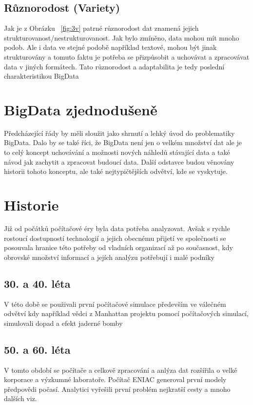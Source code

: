 \subsection{Různorodost (Variety)}
Jak je z Obrázku ~\ref{fig:3v} patrné různorodost dat znamená jejich strukturovanost/nestrukturovanost. Jak bylo zmíněno, data mohou mít mnoho podob. Ale i data ve stejné podobě například textové, mohou být jinak strukturovány a tomuto faktu je potřeba se přizpůsobit a uchovávat a zpracovávat data v jiných formátech. Tato různorodost a adaptabilita je tedy poslední charakteristikou BigData

\section{BigData zjednodušeně}
Předcházející řády by měli sloužit jako shrnutí a lehký úvod do problematiky BigData. Dalo by se také říci, že BigData není jen o velkém množství dat ale je to celý koncept uchovávání a možnosti nových náhledů stávající data a také návod jak zachytit a zpracovat budoucí data. Další odstavce budou věnovány historii tohoto konceptu, ale také nejtypičtějších odvětví, kde se vyskytuje. 

\section{Historie}

Již od počátků počítačové éry byla data potřeba analyzovat. \cite{history} Avšak s rychle rostoucí dostupností technologií a jejich obecnému přijetí ve společnosti se posouvala hranice této potřeby od vladních organizací až po současnost, kdy obrovské množství informací a jejích analýzu potřebují i malé podníky

\subsection{30. a 40. léta}
V této době se použivali první počítačové simulace především ve válečném odvětví kdy například vědci z Manhattan projektu pomocí počítačových simulací, simulovali dopad a efekt jaderné bomby

\subsection{50. a 60. léta}
V tomto období se počítače a celkově zpracování a anlýza dat rozšířila o velké korporace a výzkumné laboratoře. Počítač ENIAC generoval první modely předpovědi počasí. Analytici vyřešili první problém nejkratší cesty a mnoho dalších viz. \cite{history}

